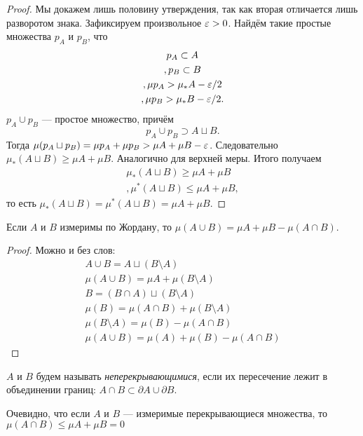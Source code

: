 \begin{proof}
Мы докажем лишь половину утверждения, так как вторая отличается лишь разворотом знака. Зафиксируем произвольное $\varepsilon > 0$. Найдём такие простые множества $p_A$ и $p_B$, что
\begin{gather}
    p_A \subset A\\,
    p_B \subset B\\,
    \mu p_A > \mu_*A - \varepsilon/2\\,
    \mu p_B > \mu_*B - \varepsilon/2.
\end{gather}
$p_A \cup p_B$ --- простое множество, причём
$$
    p_A \cup p_B \supset A \sqcup B.
$$
Тогда $\mu(p_A \sqcup p_B) = \mu p_A + \mu p_B > \mu A + \mu B - \varepsilon$. Следовательно $\mu_*(A \sqcup B)\geqslant \mu A + \mu B$. Аналогично для верхней меры. Итого получаем
\begin{gather}
    \mu_*(A \sqcup B)\geqslant \mu A + \mu B\\,
    \mu^*(A \sqcup B)\leqslant \mu A + \mu B,
\end{gather}
то есть $\mu_*(A \sqcup B) = \mu^*(A \sqcup B) = \mu A + \mu B.$
\end{proof}
\begin{Consequence}
    Если $A$ и $B$ измеримы по Жордану, то $\mu (A \cup B) = \mu A + \mu B - \mu(A \cap B)$.
\end{Consequence}
\begin{proof}
Можно и без слов:
\begin{gather}    
    A \cup B = A \sqcup (B\setminus A)\\
    \mu (A \cup B) = \mu A + \mu(B \setminus A)\\
    B = (B \cap A) \sqcup (B \setminus A)\\
    \mu(B) = \mu(A \cap B) + \mu(B \setminus A)\\
    \mu(B \setminus A) = \mu(B) - \mu(A \cap B)\\
    \mu(A \cup B) = \mu(A) + \mu(B) - \mu(A \cap B)
\end{gather}
\end{proof}
\begin{Def}
    $A$ и $B$ будем называть \textit{неперекрывающимися}, если их пересечение лежит в объединении границ: $A\cap B \subset \partial A \cup \partial B$.
\end{Def}
Очевидно, что если $A$ и $B$ --- измеримые перекрывающиеся множества, то $\mu(A \cap B) \leq \mu A +\mu B = 0$
\begin{Comment}
    
\end{Comment}
